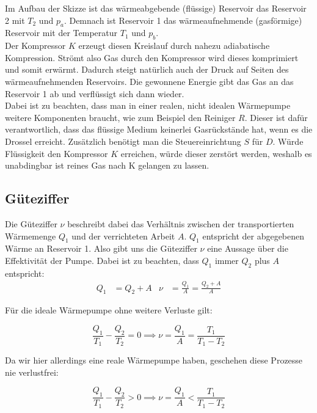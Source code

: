 Im Aufbau der Skizze ist das wärmeabgebende (flüssige) Reservoir das Reservoir 2 mit $T_{2}$ und $p_{a}$. Demnach ist Reservoir 1 das wärmeaufnehmende
(gasförmige) Reservoir mit der Temperatur $T_{1}$ und $p_{b}$. \\

Der Kompressor $K$ erzeugt diesen Kreislauf durch nahezu adiabatische Kompression. Strömt also Gas durch den 
Kompressor wird dieses komprimiert und somit erwärmt.
Dadurch steigt natürlich auch der Druck auf Seiten des wärmeaufnehmenden Reservoirs.
Die gewonnene Energie gibt das Gas an das Reservoir 1 ab und verflüssigt sich dann wieder.\\

Dabei ist zu beachten, dass man in einer realen, nicht idealen Wärmepumpe weitere Komponenten braucht, wie zum Beispiel den Reiniger $R$.
Dieser ist dafür verantwortlich, dass das flüssige Medium keinerlei Gasrückstände hat, wenn es die Drossel erreicht.
Zusätzlich benötigt man die Steuereinrichtung $S$ für $D$. Würde Flüssigkeit den Kompressor $K$ erreichen, würde dieser zerstört werden,
weshalb es unabdingbar ist reines Gas nach K gelangen zu lassen.

\subsection{Güteziffer} \label{sec:Güteziffer}

Die Güteziffer $\nu$ beschreibt dabei das Verhältnis zwischen der transportierten Wärmemenge $Q_{1}$ und der verrichteten Arbeit $A$.
$Q_{1}$ entspricht der abgegebenen Wärme an Reservoir 1. Also gibt uns die Güteziffer $\nu$ eine Aussage über die Effektivität der Pumpe.
Dabei ist zu beachten, dass $Q_{1}$ immer $Q_{2}$ plus $A$ entspricht:
\begin{align} \label{eq:Güteziffer}
    Q_{1} &= Q_{2} + A & \nu &= \frac{Q_{1}}{A} = \frac{Q_{2} + A}{A}
\end{align}

Für die ideale Wärmepumpe ohne weitere Verluste gilt:

\begin{equation}
    \frac{Q_{1}}{T_{1}} - \frac{Q_{2}}{T_{2}} = 0 \implies \nu = \frac{Q_{1}}{A} = \frac{T_{1}}{T_{1} - T_{2}}
\end{equation}

Da wir hier allerdings eine reale Wärmepumpe haben, geschehen diese Prozesse nie verlustfrei:

\begin{equation}
    \frac{Q_{1}}{T_{1}} - \frac{Q_{2}}{T_{2}} > 0 \implies \nu = \frac{Q_{1}}{A} < \frac{T_{1}}{T_{1} - T_{2}}
\end{equation}

